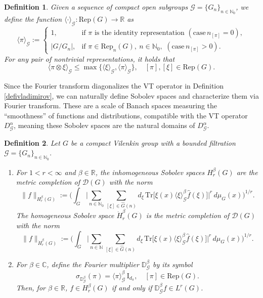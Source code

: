 \documentclass[12pt, reqno]{amsart}
\newtheorem{defi}{Definition}[section]
\newcommand{\N}{\mathbb{N}}
\newcommand{\1}{\mathds{1}}
\begin{document}
\begin{defi}
Given a sequence of compact open subgroups $ \mathcal{G}=\{ G_n \}_{n \in \N_0}$, we define the function $\langle \cdot \rangle_{\mathcal{G}} : \mathrm{Rep}(G) \to \mathbb{R}$ as
\[
\langle \pi \rangle_{\mathcal{G}} :=
\begin{cases}
1, & \text{if } \pi \text{ is the identity representation} \, \, (\text{case} \, n_{[\pi]} =0), \\
|G/G_n|, & \text{if } \pi \in \mathrm{Rep}_n(G),\ n \in \mathbb{N}_0, \, \, (\text{case} \, n_{[\pi]} >0).
\end{cases}
\]
For any pair of nontrivial representations, it holds that
\[
\langle \pi \otimes \xi \rangle_{\mathcal{G}} \le \max \{ \langle \xi \rangle_{\mathcal{G}}, \langle \pi \rangle_{\mathcal{G}} \}, \quad [\pi], [\xi] \in \mathrm{Rep}(G).
\]
\end{defi}

Since the Fourier transform diagonalizes the VT operator in Definition \ref{defivladimirov}, we can naturally define Sobolev spaces and characterize them via Fourier transform. These are a scale of Banach spaces measuring the ``smoothness'' of functions and distributions, compatible with the VT operator $D_\mathcal{G}^\alpha$, meaning these Sobolev spaces are the natural domains of $D_\mathcal{G}^\alpha$.

\begin{defi}\normalfont
Let $G$ be a compact Vilenkin group with a bounded filtration $\mathcal{G} = \{ G_n \}_{n \in \mathbb{N}_0}$.
\begin{enumerate}
\item For $1 < r < \infty$ and $\beta \in \mathbb{R}$, the inhomogeneous Sobolev spaces $H_r^\beta(G)$ are the metric completion of $\mathcal{D}(G)$ with the norm
\[
\| f \|_{H_r^\beta(G)} := \Bigg( \int_G \Big| \sum_{n \in \mathbb{N}_0} \sum_{[\xi] \in \widehat{G}(n)} d_\xi \, \mathrm{Tr}\big[ \xi(x) \langle \xi \rangle_\mathcal{G}^\beta \widehat{f}(\xi) \big] \Big|^r \, d\mu_G(x) \Bigg)^{1/r}.
\]
The homogeneous Sobolev space $\dot{H}_r^\beta(G)$ is the metric completion of $\mathcal{D}(G)$ with the norm
\[
\| f \|_{\dot{H}_r^\beta(G)} := \Bigg( \int_G \Big| \sum_{n \in \mathbb{N}} \sum_{[\xi] \in \widehat{G}(n)} d_\xi \, \mathrm{Tr}\big[ \xi(x) \langle \xi \rangle_\mathcal{G}^\beta \widehat{f}(\xi) \big] \Big|^r \, d\mu_G(x) \Bigg)^{1/r}.
\]

\item For $\beta \in \mathbb{C}$, define the Fourier multiplier $\mathbb{D}_\mathcal{G}^\beta$ by its symbol
\[
\sigma_{\mathbb{D}_\mathcal{G}^\beta}(\pi) = \langle \pi \rangle_\mathcal{G}^\beta \, \mathrm{I}_{d_\pi}, \quad [\pi] \in \mathrm{Rep}(G).
\]
Then, for $\beta \in \mathbb{R}$, $f \in H_r^\beta(G)$ if and only if $\mathbb{D}_\mathcal{G}^\beta f \in L^r(G)$.
\end{enumerate}
\end{defi}
\end{document}
